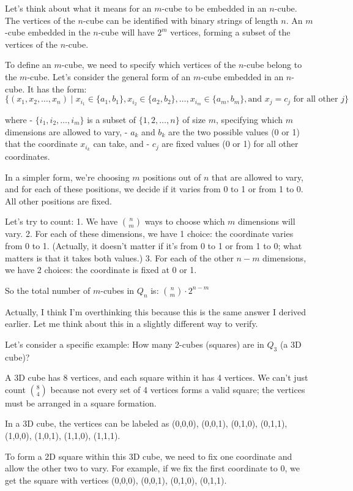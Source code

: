 \documentclass[12p]{article}
\newcounter{reasoningcounter}
\newenvironment{reasoning}[1][]
{\refstepcounter{reasoningcounter}%
\begin{tcolorbox}[
    title=Reasoning \thereasoningcounter: #1,
    colback=white, %
    colframe=gray,
    coltext=black, %
    fonttitle=\bfseries\normalsize,
    top=2mm,
    bottom=2mm,
    enlarge top initially by=5mm
]
\small
}
{\end{tcolorbox}}
\begin{document}
\begin{reasoning}
Let's think about what it means for an $m$-cube to be embedded in an $n$-cube. The vertices of the $n$-cube can be identified with binary strings of length $n$. An $m$-cube embedded in the $n$-cube will have $2^m$ vertices, forming a subset of the vertices of the $n$-cube.

To define an $m$-cube, we need to specify which vertices of the $n$-cube belong to the $m$-cube. Let's consider the general form of an $m$-cube embedded in an $n$-cube. It has the form:
$\{(x_1, x_2, \dots, x_n) \mid x_{i_1} \in \{a_1, b_1\}, x_{i_2} \in \{a_2, b_2\}, \dots, x_{i_m} \in \{a_m, b_m\}, \text{and } x_j = c_j \text{ for all other } j\}$

where
- $\{i_1, i_2, \dots, i_m\}$ is a subset of $\{1, 2, \dots, n\}$ of size $m$, specifying which $m$ dimensions are allowed to vary,
- $a_k$ and $b_k$ are the two possible values (0 or 1) that the coordinate $x_{i_k}$ can take, and
- $c_j$ are fixed values (0 or 1) for all other coordinates.

In a simpler form, we're choosing $m$ positions out of $n$ that are allowed to vary, and for each of these positions, we decide if it varies from 0 to 1 or from 1 to 0. All other positions are fixed.

Let's try to count:
1. We have $\binom{n}{m}$ ways to choose which $m$ dimensions will vary.
2. For each of these dimensions, we have 1 choice: the coordinate varies from 0 to 1. (Actually, it doesn't matter if it's from 0 to 1 or from 1 to 0; what matters is that it takes both values.)
3. For each of the other $n-m$ dimensions, we have 2 choices: the coordinate is fixed at 0 or 1.

So the total number of $m$-cubes in $Q_n$ is:
$\binom{n}{m} \cdot 2^{n-m}$

Actually, I think I'm overthinking this because this is the same answer I derived earlier. Let me think about this in a slightly different way to verify.

Let's consider a specific example: How many 2-cubes (squares) are in $Q_3$ (a 3D cube)?

A 3D cube has 8 vertices, and each square within it has 4 vertices. We can't just count $\binom{8}{4}$ because not every set of 4 vertices forms a valid square; the vertices must be arranged in a square formation.

In a 3D cube, the vertices can be labeled as (0,0,0), (0,0,1), (0,1,0), (0,1,1), (1,0,0), (1,0,1), (1,1,0), (1,1,1).

To form a 2D square within this 3D cube, we need to fix one coordinate and allow the other two to vary. For example, if we fix the first coordinate to 0, we get the square with vertices (0,0,0), (0,0,1), (0,1,0), (0,1,1).


\end{reasoning}
\end{document}
